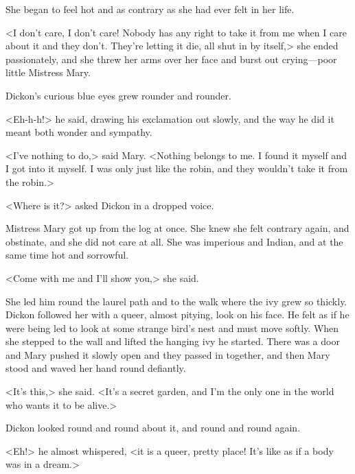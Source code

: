 She began to feel hot and as contrary as she had ever felt in her life.

<I don't care, I don't care! Nobody has any right to take it from me when I care about it and they don't. They're letting it die, all shut in by itself,> she ended passionately, and she threw her arms over her face and burst out crying—poor little Mistress Mary.

Dickon's curious blue eyes grew rounder and rounder.

<Eh-h-h!> he said, drawing his exclamation out slowly, and the way he did it meant both wonder and sympathy.

<I've nothing to do,> said Mary. <Nothing belongs to me. I found it myself and I got into it myself. I was only just like the robin, and they wouldn't take it from the robin.>

<Where is it?> asked Dickon in a dropped voice.

Mistress Mary got up from the log at once. She knew she felt contrary again, and obstinate, and she did not care at all. She was imperious and Indian, and at the same time hot and sorrowful.

<Come with me and I'll show you,> she said.

She led him round the laurel path and to the walk where the ivy grew so thickly. Dickon followed her with a queer, almost pitying, look on his face. He felt as if he were being led to look at some strange bird's nest and must move softly. When she stepped to the wall and lifted the hanging ivy he started. There was a door and Mary pushed it slowly open and they passed in together, and then Mary stood and waved her hand round defiantly.

<It's this,> she said. <It's a secret garden, and I'm the only one in the world who wants it to be alive.>

Dickon looked round and round about it, and round and round again.

<Eh!> he almost whispered, <it is a queer, pretty place! It's like as if a body was in a dream.>
